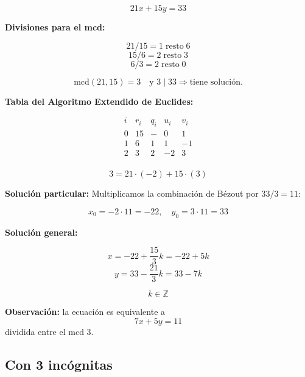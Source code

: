 \documentclass[a4paper,12pt]{article}
\begin{document}
\begin{ejemplo}[title={Ecuación con solución}]
\[
21x + 15y = 33
\]

\textbf{Divisiones para el mcd:}

\[
21 / 15 = 1 \;\text{resto}\; 6
\]
\[
15 / 6 = 2 \;\text{resto}\; \boxed{3}
\]
\[
6 / 3 = 2 \;\text{resto}\; 0
\]

\[
\text{mcd}(21,15) = \boxed{3} \quad \text{y } 3 \mid 33 \Rightarrow \text{tiene solución.}
\]

\textbf{Tabla del Algoritmo Extendido de Euclides:}

\[
\begin{array}{c|c|c|c|c}
i & r_i & q_i & u_i & v_i \\
\hline
0 & 15 & - & 0 & 1 \\
1 & 6 & 1 & 1 & -1 \\
2 & \boxed{3} & 2 & -2 & 3 \\
\end{array}
\]

\[
\boxed{3} = 21 \cdot (-2) + 15 \cdot (3)
\]

\textbf{Solución particular:}  
Multiplicamos la combinación de Bézout por \(33/3 = 11\):

\[
x_0 = -2 \cdot 11 = -22, \quad y_0 = 3 \cdot 11 = 33
\]

\textbf{Solución general:}

\[
x = -22 + \frac{15}{3} k = -22 + 5 k
\]
\[
y = 33 - \frac{21}{3} k = 33 - 7 k
\]

\[
k \in \mathbb{Z}
\]

\textbf{Observación:} la ecuación es equivalente a
\[
7x + 5y = 11
\]
dividida entre el mcd \(3\).
\end{ejemplo}

\subsection{Con 3 incógnitas}
\end{document}
